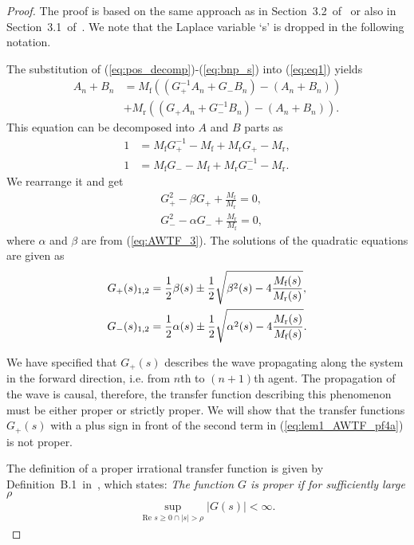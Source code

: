\documentclass[10pt,twocolumn,twoside]{IEEEtran}
\theoremstyle{definition}
\begin{document}
\begin{proof}
The proof is based on the same approach as in Section~3.2~of~\cite{Martinec2014a} or also in Section~3.1~of~\cite{OConnor2006}. We note that the Laplace variable `s' is dropped in the following notation.

The substitution of (\ref{eq:pos_decomp})-(\ref{eq:bnp_s}) into (\ref{eq:eq1}) yields
\begin{align}
  A_n + B_n &= M_{\text{f}}\left((G_+^{-1}A_{n}+G_-B_{n})-(A_n+B_n)\right)\nonumber\\
  & + M_{\text{r}}\left((G_+A_{n}+G_-^{-1}B_{n})-(A_n+B_n)\right).\label{eq:lem1_AWTF_pf1}
\end{align}
This equation can be decomposed into $A$ and $B$ parts as
\begin{align}
  1 &= M_{\text{f}}G_{+}^{-1}-M_{\text{f}}+M_{\text{r}}G_+ - M_{\text{r}},\label{eq:lem1_AWTF_pf2a}\\
  1 &= M_{\text{f}}G_{-} -M_{\text{f}} + M_{\text{r}}G_-^{-1} - M_{\text{r}}.\label{eq:lem1_AWTF_pf2b}
\end{align}
We rearrange it and get
\begin{align}
  &G_+^{2}-\beta G_+ + \frac{M_{\text{f}}}{M_{\text{r}}} = 0,\label{eq:lem1_AWTF_pf3a}\\
  &G_-^{2}-\alpha G_- + \frac{M_{\text{r}}}{M_{\text{f}}} = 0,\label{eq:lem1_AWTF_pf3b}
\end{align}
where $\alpha$ and $\beta$ are from (\ref{eq:AWTF_3}). The solutions of the quadratic equations are given as
\begin{align}
  G_{+}(s)_{1,2} &= \frac{1}{2}\beta(s) \pm \frac{1}{2}\sqrt{\beta^2(s)-4\frac{M_{\textnormal{f}}(s)} {M_{\textnormal{r}}(s)}},\label{eq:lem1_AWTF_pf4a} \\
  G_{-}(s)_{1,2} &= \frac{1}{2}\alpha(s) \pm \frac{1}{2}\sqrt{\alpha^2(s)-4\frac{M_{\textnormal{r}}(s)} {M_{\textnormal{f}}(s)}}.\label{eq:lem1_AWTF_pf4b}
\end{align}

We have specified that $G_+(s)$ describes the wave propagating along the system in the forward direction, i.e. from $n$th to $(n+1)$th agent. The propagation of the wave is causal, therefore, the transfer function describing this phenomenon must be either proper or strictly proper. We will show that the transfer functions $G_{+}(s)$ with a plus sign in front of the second term in (\ref{eq:lem1_AWTF_pf4a}) is not proper.

The definition of a proper irrational transfer function is given by Definition~B.1~in~\cite{Curtain2009}, which states: \emph{The function $G$ is proper if for sufficiently large $\rho$
\begin{align}
  \sup_{\text{Re }s\geq 0 \cap |s|>\rho} |G(s)| < \infty.
\end{align}}


\end{proof}
\end{document}
